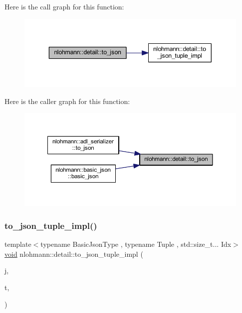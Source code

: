 Here is the call graph for this function\+:
\nopagebreak
\begin{figure}[H]
\begin{center}
\leavevmode
\includegraphics[width=343pt]{namespacenlohmann_1_1detail_aa7a47b08eee864c2c108c04954919648_cgraph}
\end{center}
\end{figure}
Here is the caller graph for this function\+:
\nopagebreak
\begin{figure}[H]
\begin{center}
\leavevmode
\includegraphics[width=350pt]{namespacenlohmann_1_1detail_aa7a47b08eee864c2c108c04954919648_icgraph}
\end{center}
\end{figure}
\mbox{\label{namespacenlohmann_1_1detail_a510dfa15b01e9a8afe31600a27b28199}} 
\subsubsection{\texorpdfstring{to\_json\_tuple\_impl()}{to\_json\_tuple\_impl()}}
{\footnotesize\ttfamily template$<$typename Basic\+Json\+Type , typename Tuple , std\+::size\+\_\+t... Idx$>$ \\
\mbox{\hyperlink{namespacenlohmann_1_1detail_a59fca69799f6b9e366710cb9043aa77d}{void}} nlohmann\+::detail\+::to\+\_\+json\+\_\+tuple\+\_\+impl (\begin{DoxyParamCaption}\item[{Basic\+Json\+Type \&}]{j,  }\item[{const Tuple \&}]{t,  }\item[{\mbox{\hyperlink{structnlohmann_1_1detail_1_1index__sequence}{index\+\_\+sequence}}$<$ Idx... $>$}]{ }\end{DoxyParamCaption})}



